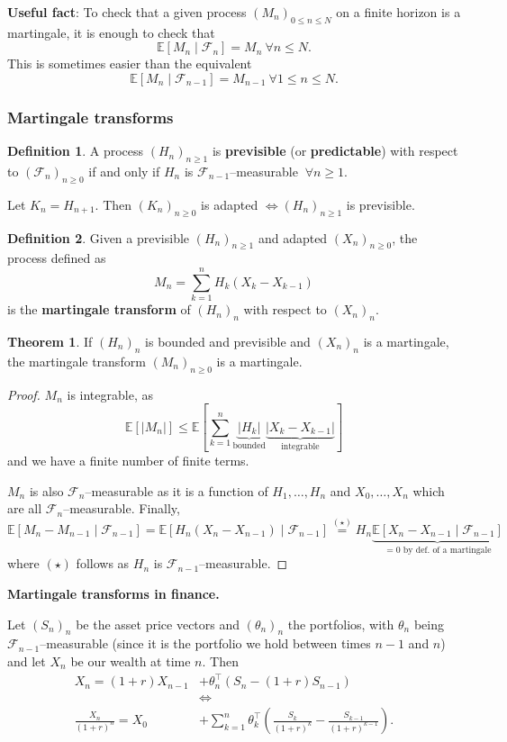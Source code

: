 \documentclass{article}
\theoremstyle{definition}
\newtheorem{theorem}{Theorem}[section]
\newtheorem{defn}{Definition}[section]
\begin{document}
\textbf{Useful fact}: To check that a given process $(M_n)_{0\le n \le N}$ on a finite horizon is a martingale, it is enough to check that 
\[
\mathbb{E}[M_n \mid \mathcal{F}_n] = M_n ~\forall n\le N.
\]
This is sometimes easier than the equivalent 
\[
\mathbb{E}[M_n \mid \mathcal{F}_{n-1}] = M_{n-1} ~\forall 1\le n\le N.
\]
\subsubsection{Martingale transforms}
\begin{defn}
    A process $(H_n)_{n\ge 1}$ is \textbf{previsible} (or \textbf{predictable}) with respect to $(\mathcal{F}_n)_{n\ge 0}$ if and only if $H_n$ is $\mathcal{F}_{n-1}$--measurable $~\forall n\ge 1$.
\end{defn}
Let $K_n = H_{n+1}$. Then $(K_n)_{n\ge 0}$ is adapted $\iff (H_n)_{n\ge 1}$ is previsible.

\begin{defn}
    Given a previsible $(H_n)_{n\ge 1}$ and adapted $(X_n)_{n\ge 0}$, the process defined as \[
    M_n = \sum_{k=1}^{n} H_k(X_k-X_{k-1})
    \]
    is the \textbf{martingale transform} of $(H_n)_n$ with respect to $(X_n)_n$.
\end{defn}
\begin{theorem}
    If $(H_n)_n$ is bounded and previsible and $(X_n)_n$ is a martingale, the martingale transform $(M_n)_{n\ge 0}$ is a martingale.
\end{theorem}
\begin{proof}
    $M_n$ is integrable, as $$\mathbb{E}[|M_n|]\le \mathbb{E}[\sum_{k=1}^{n} \underbrace{|H_k|}_{\text{bounded}}\underbrace{|X_k-X_{k-1}|}_{\text{integrable}}]$$ 
    and we have a finite number of finite terms.

    $M_n$ is also $\mathcal{F}_n$--measurable as it is a function of $H_1,\ldots,H_n$ and $X_0,\ldots,X_n$ which are all $\mathcal{F}_n$--measurable. Finally, 
    \[
    \mathbb{E}[M_n - M_{n-1} \mid \mathcal{F}_{n-1}] = \mathbb{E}[H_n(X_n-X_{n-1}) \mid \mathcal{F}_{n-1}] \stackrel{(\star)}{=}  H_n \underbrace{\mathbb{E}[X_n-X_{n-1} \mid \mathcal{F}_{n-1}]}_{=0 \text{ by def. of a martingale}}
    \]
    where $(\star)$ follows as $H_n$ is $\mathcal{F}_{n-1}$--measurable.
\end{proof}

\textbf{Martingale transforms in finance.} 

Let $(S_n)_n$ be the asset price vectors and $(\theta_n)_n$ the portfolios, with $\theta_n$ being $\mathcal{F}_{n-1}$--measurable (since it is the portfolio we hold between times $n-1$ and $n$) and let $X_n$ be our wealth at time $n$. Then
\begin{align*}
    X_n = (1+r)X_{n-1} &+ \theta^\top_n(S_n -(1+r)S_{n-1}) \\ &\iff\\  \frac{X_n}{(1+r)^{n}} = X_0 &+ \sum_{k=1}^{n} \theta_k^\top\left(\frac{S_k}{(1+r)^k} - \frac{S_{k-1}}{(1+r)^{k-1}}\right).    
\end{align*}
\end{document}

